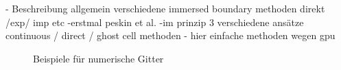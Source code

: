 - Beschreibung allgemein verschiedene immersed boundary methoden direkt /exp/ imp etc
    -erstmal peskin et al.
    -im prinzip 3 verschiedene ansätze continuous / direct /  ghost cell methoden
    - hier einfache methoden wegen gpu


\begin{figure}[!bp]
  \centering
  \hfill
  \caption{Beispiele für numerische Gitter}
\end{figure}
\newpage

